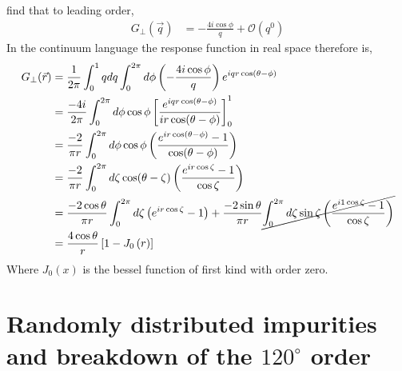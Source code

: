 \documentclass{article}
\newcommand{\ordO}{\mathcal{O}}
\newcommand{\vq}{\vec{q}}
\newcommand{\vr}{\vec{r}}
\begin{document}
find that to leading order,
\begin{equation}
    \begin{aligned}
        G_\perp(\vq) &= -\frac{4 i\cos\phi}{q}
        +\ordO(q^0)
    \end{aligned}
\end{equation}
In the continuum language the response function in real 
space therefore is,
\begin{equation}
    \begin{aligned}
        G_\perp(\vr) &=
        \frac{1}{2\pi}
        \int^1_0 qdq
        \int^{2\pi}_{0} d\phi
        \left(-\frac{4i\cos\phi}{q}\right)
        e^{iqr\cos(\theta-\phi)} \\
        &= \frac{-4i}{2\pi}
        \int^{2\pi}_0 d\phi\cos\phi
        \left[\frac{e^{iqr\cos(\theta-\phi)}}
            {ir\cos(\theta-\phi)}
        \right]^1_0 \\
        &=\frac{-2}{\pi r}
        \int^{2\pi}_{0}d\phi\cos\phi
        \left(\frac{e^{ir\cos(\theta-\phi)}
            -1}
        {\cos(\theta-\phi)}\right) \\
        &=\frac{-2}{\pi r}
        \int^{2\pi}_{0}d\zeta\cos(\theta-\zeta)
        \left(\frac{e^{ir\cos\zeta}
            -1}
        {\cos\zeta}\right) \\
        &=\frac{-2\cos\theta}{\pi r}
        \int^{2\pi}_{0}d\zeta
        \left(e^{i r\cos\zeta}-1\right)
        +\frac{-2\sin\theta}{\pi r}
        \cancel{\int^{2\pi}_{0}d\zeta\sin\zeta
            \left(\frac{e^{i1\cos\zeta}
                -1}
        {\cos\zeta}\right)} \\
        &= \frac{4\cos\theta}{r}
        \left[1-J_0\left(r\right)\right]
    \end{aligned}
\end{equation}
Where $J_0(x)$ is the bessel function of first kind with 
order zero.

\section{Randomly distributed impurities and breakdown of
the $120^\circ$ order}
\end{document}
